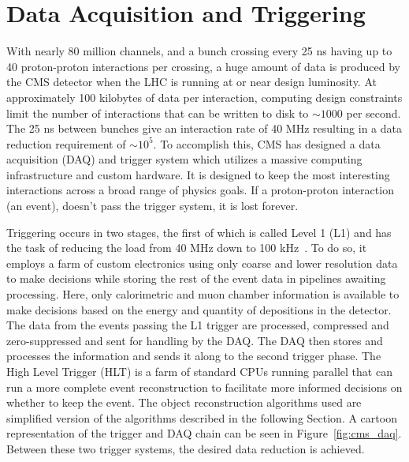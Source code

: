 \section{Data Acquisition and Triggering}               \label {sec:cms_daq}
With nearly 80 million channels, and a bunch crossing every 25 ns having up to
40 proton-proton interactions per crossing, a huge amount of data is produced
by the CMS detector when the LHC is running at or near design luminosity.
At approximately 100 kilobytes of data per interaction, computing design
constraints limit the number of interactions that can be written to disk to
$\sim1000$ per second. The 25 ns between bunches give an interaction rate of 40
MHz resulting in a data reduction requirement of $\sim 10^5$. To accomplish
this, CMS has designed a data acquisition (DAQ) and trigger system which
utilizes a massive computing infrastructure and custom hardware. It is designed
to keep the most interesting interactions across a broad range of physics
goals. If a proton-proton interaction (an event), doesn't pass the trigger
system, it is lost forever.

Triggering occurs in two stages, the first of which is called Level
1 (L1) and has the task of reducing the load from 40 MHz down to 100
kHz~\cite{triggertdr1}. To do so, it employs a farm of custom electronics using
only coarse and lower resolution data to make decisions while storing the rest
of the event data in pipelines awaiting processing. Here, only calorimetric
and muon chamber information is available to make decisions based on the
energy and quantity of depositions in the detector. The data from the events
passing the L1 trigger are processed, compressed and zero-suppressed and sent
for handling by the DAQ. The DAQ then stores and processes the information and
sends it along to the second trigger phase. The High Level Trigger (HLT) is
a farm of standard CPUs running parallel that can run a more complete event
reconstruction to facilitate more informed decisions on whether to keep the
event. The object reconstruction algorithms used are simplified version of the
algorithms described in the following Section. A cartoon representation of the
trigger and DAQ chain can be seen in Figure~\ref{fig:cms_daq}. Between these
two trigger systems, the desired data reduction is achieved.

